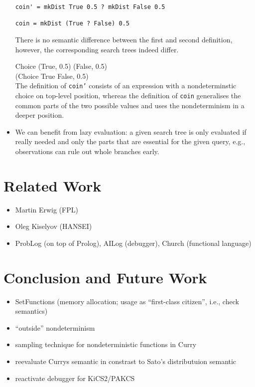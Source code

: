 \documentclass[
12pt, %
a4paper, %
oneside, %
]{llncs}
\newcommand{\code}[1]{{\texttt{#1}}}
\begin{document}
\begin{itemize}
\begin{verbatim}
coin' = mkDist True 0.5 ? mkDist False 0.5

coin = mkDist (True ? False) 0.5
\end{verbatim}

  There is no semantic difference between the first and second
  definition, however, the corresponding search trees indeed differ. %

  Choice (True, 0.5) (False, 0.5)\\%
  (Choice True False, 0.5)\\%

  The definition of \code{coin'} consists of an expression with a
  nondeterminstic choice on top-level position, whereas the definition
  of \code{coin} generalises the common parts of the two possible
  values and uses the nondeterminism in a deeper position. %


\item We can benefit from lazy evaluation: a given search tree is only
  evaluated if really needed and only the parts that are essential for
  the given query, e.g., observations can rule out whole branches
  early. %
  
\end{itemize}

\section{Related Work}

\begin{itemize}
\item Martin Erwig (FPL)
\item Oleg Kiselyov (HANSEI)
\item ProbLog (on top of Prolog), AILog (debugger), Church (functional language)
\end{itemize}

\section{Conclusion and Future Work}
\begin{itemize}
\item SetFunctions (memory allocation; usage as ``first-class
  citizen'', i.e., check semantics)
\item ``outside'' nondeterminism
\item sampling technique for nondeterministic functions in Curry
\item reevaluate Currys semantic in constrast to Sato's distributuion semantic
\item reactivate debugger for KiCS2/PAKCS
\end{itemize}



\end{document}
